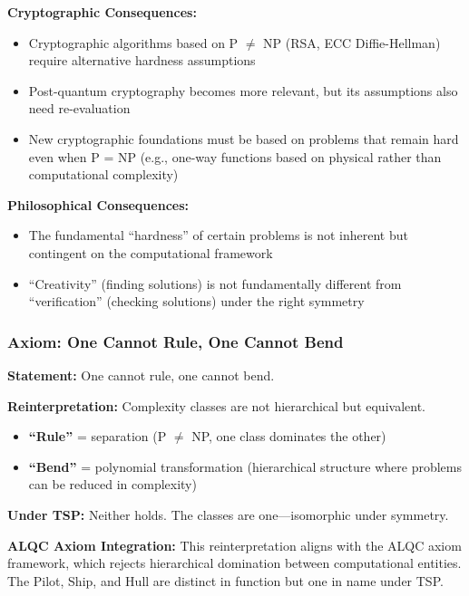 \documentclass[11pt, letterpaper]{article}
\begin{document}
\textbf{Cryptographic Consequences:}
\begin{itemize}
    \item Cryptographic algorithms based on P $\neq$ NP (RSA, ECC Diffie-Hellman) require alternative hardness assumptions
    \item Post-quantum cryptography becomes more relevant, but its assumptions also need re-evaluation
    \item New cryptographic foundations must be based on problems that remain hard even when P = NP (e.g., one-way functions based on physical rather than computational complexity)
\end{itemize}

\textbf{Philosophical Consequences:}
\begin{itemize}
    \item The fundamental ``hardness'' of certain problems is not inherent but contingent on the computational framework
    \item ``Creativity'' (finding solutions) is not fundamentally different from ``verification'' (checking solutions) under the right symmetry
\end{itemize}

\subsubsection{Axiom: One Cannot Rule, One Cannot Bend}

\textbf{Statement:} One cannot rule, one cannot bend.

\textbf{Reinterpretation:} Complexity classes are not hierarchical but equivalent.

\begin{itemize}
    \item \textbf{``Rule''} = separation (P $\neq$ NP, one class dominates the other)
    \item \textbf{``Bend''} = polynomial transformation (hierarchical structure where problems can be reduced in complexity)
\end{itemize}

\textbf{Under TSP:} Neither holds. The classes are one—isomorphic under symmetry.

\textbf{ALQC Axiom Integration:} This reinterpretation aligns with the ALQC axiom framework, which rejects hierarchical domination between computational entities. The Pilot, Ship, and Hull are distinct in function but one in name under TSP.

\end{document}
